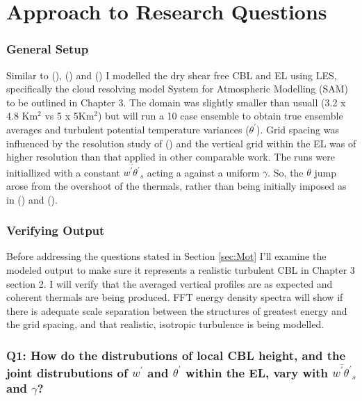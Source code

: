 \section{Approach to Research Questions}
\label{sec:Approach}
\subsubsection{General Setup}

Similar to \citeauthor{SullMoengStev} (\citeyear{SullMoengStev}), \citeauthor{FedConzMir04} (\citeyear{FedConzMir04}) and \citeauthor{BrooksFowler2} (\citeyear{BrooksFowler2}) I modelled the dry shear free \acs{CBL} and \acs{EL} using \acs{LES}, specifically the cloud resolving model System for Atmospheric Modelling (SAM) to be outlined in Chapter 3.  The domain was slightly smaller than usuall (3.2 x 4.8 Km$^{2}$ vs 5 x 5Km$^{2}$) but will run a 10 case ensemble to obtain true ensemble averages and turbulent potential temperature variances ($\theta^{'}$). Grid spacing was influenced by the resolution study of \citeauthor{SullPat} (\citeyear{SullPat}) and the vertical grid within the \acs{EL} was of higher resolution than that applied in other comparable work.  The runs were initiallized with a constant $\overline{w^{'}\theta^{'}}_{s}$ acting a against a uniform $\gamma$.  So, the  $\theta$ jump arose from the overshoot of the thermals, rather than being initially imposed as in \citeauthor{SullMoengStev} (\citeyear{SullMoengStev}) and \citeauthor{BrooksFowler2} (\citeyear{BrooksFowler2}).\\

\subsubsection{Verifying Output}

Before addressing the questions stated in Section \ref{sec:Mot} I'll examine the modeled output to make sure it represents a realistic turbulent \acs{CBL} in Chapter 3 section 2. I will verify that the averaged vertical profiles are as expected and coherent thermals are being produced.  FFT energy density spectra will show if there is adequate scale separation between the structures of greatest energy and the grid spacing, and that realistic, isotropic turbulence is being modelled.  

\subsubsection{Q1: How do the distrubutions of local \acs{CBL} height, and the joint distrubutions of $w^{'}$ and $\theta^{'}$ within the \acs{EL}, vary with $\overline{w^{'}\theta^{'}}_{s}$ and $\gamma$?}     

